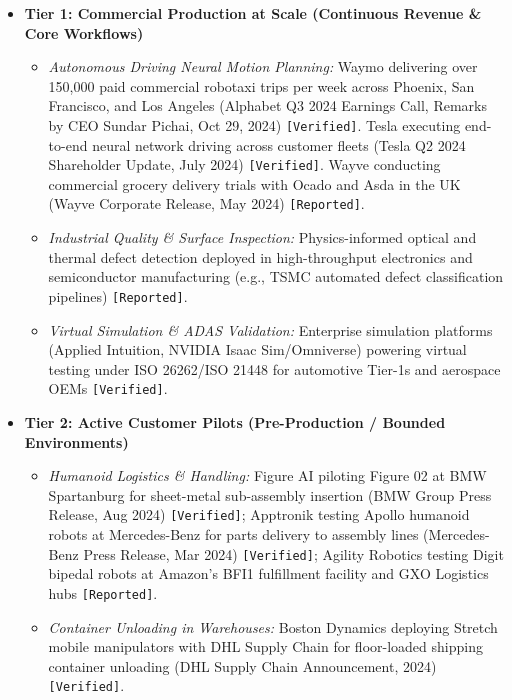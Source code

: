 \documentclass[11pt,a4paper]{article}
\begin{document}
\begin{itemize}
    \item \textbf{Tier 1: Commercial Production at Scale (Continuous Revenue \& Core Workflows)}
    \begin{itemize}
        \item \textit{Autonomous Driving Neural Motion Planning:} Waymo delivering over 150,000 paid commercial robotaxi trips per week across Phoenix, San Francisco, and Los Angeles (Alphabet Q3 2024 Earnings Call, Remarks by CEO Sundar Pichai, Oct 29, 2024) \texttt{[Verified]}. Tesla executing end-to-end neural network driving across customer fleets (Tesla Q2 2024 Shareholder Update, July 2024) \texttt{[Verified]}. Wayve conducting commercial grocery delivery trials with Ocado and Asda in the UK (Wayve Corporate Release, May 2024) \texttt{[Reported]}.
        \item \textit{Industrial Quality \& Surface Inspection:} Physics-informed optical and thermal defect detection deployed in high-throughput electronics and semiconductor manufacturing (e.g., TSMC automated defect classification pipelines) \texttt{[Reported]}.
        \item \textit{Virtual Simulation \& ADAS Validation:} Enterprise simulation platforms (Applied Intuition, NVIDIA Isaac Sim/Omniverse) powering virtual testing under ISO 26262/ISO 21448 for automotive Tier-1s and aerospace OEMs \texttt{[Verified]}.
    \end{itemize}

    \item \textbf{Tier 2: Active Customer Pilots (Pre-Production / Bounded Environments)}
    \begin{itemize}
        \item \textit{Humanoid Logistics \& Handling:} Figure AI piloting Figure 02 at BMW Spartanburg for sheet-metal sub-assembly insertion (BMW Group Press Release, Aug 2024) \texttt{[Verified]}; Apptronik testing Apollo humanoid robots at Mercedes-Benz for parts delivery to assembly lines (Mercedes-Benz Press Release, Mar 2024) \texttt{[Verified]}; Agility Robotics testing Digit bipedal robots at Amazon's BFI1 fulfillment facility and GXO Logistics hubs \texttt{[Reported]}.
        \item \textit{Container Unloading in Warehouses:} Boston Dynamics deploying Stretch mobile manipulators with DHL Supply Chain for floor-loaded shipping container unloading (DHL Supply Chain Announcement, 2024) \texttt{[Verified]}.
    \end{itemize}


\end{itemize}
\end{document}
